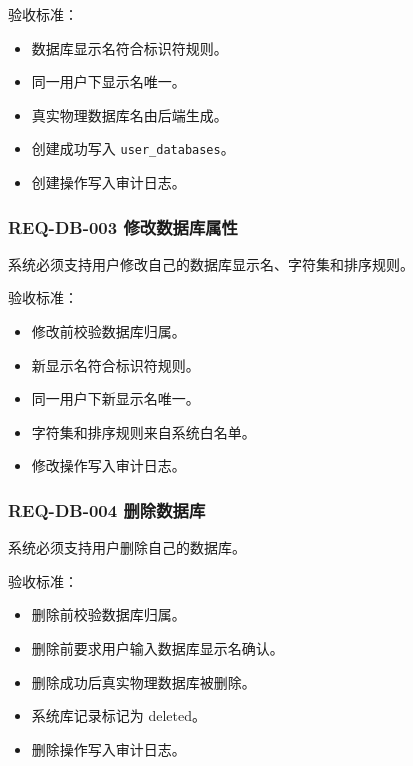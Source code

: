 \documentclass[
  a4paper,
  UTF8]{ctexart}
\providecommand{\tightlist}{%
  \setlength{\itemsep}{0pt}\setlength{\parskip}{0pt}}
\begin{document}
验收标准：

\begin{itemize}
\tightlist
\item
  数据库显示名符合标识符规则。
\item
  同一用户下显示名唯一。
\item
  真实物理数据库名由后端生成。
\item
  创建成功写入 \texttt{user\_databases}。
\item
  创建操作写入审计日志。
\end{itemize}

\hypertarget{req-db-003-ux4feeux6539ux6570ux636eux5e93ux5c5eux6027}{%
\subsubsection{REQ-DB-003
修改数据库属性}\label{req-db-003-ux4feeux6539ux6570ux636eux5e93ux5c5eux6027}}

系统必须支持用户修改自己的数据库显示名、字符集和排序规则。

验收标准：

\begin{itemize}
\tightlist
\item
  修改前校验数据库归属。
\item
  新显示名符合标识符规则。
\item
  同一用户下新显示名唯一。
\item
  字符集和排序规则来自系统白名单。
\item
  修改操作写入审计日志。
\end{itemize}

\hypertarget{req-db-004-ux5220ux9664ux6570ux636eux5e93}{%
\subsubsection{REQ-DB-004
删除数据库}\label{req-db-004-ux5220ux9664ux6570ux636eux5e93}}

系统必须支持用户删除自己的数据库。

验收标准：

\begin{itemize}
\tightlist
\item
  删除前校验数据库归属。
\item
  删除前要求用户输入数据库显示名确认。
\item
  删除成功后真实物理数据库被删除。
\item
  系统库记录标记为 deleted。
\item
  删除操作写入审计日志。
\end{itemize}
\end{document}
